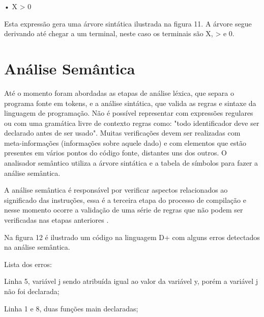 \documentclass[12pt,oneside,a4paper,chapter=TITLE,section=TITLE,sumario=tradicional]{abntex2}
\begin{document}
•	X > 0

Esta expressão gera uma árvore sintática ilustrada na figura 11. A árvore segue derivando até chegar a um terminal, neste caso os terminais são X, > e 0.

\begin{figure}[htb]
\end{figure}

\section{Análise Semântica}
\label{sec:analise-semantica}

Até o momento foram abordadas as etapas de análise léxica, que separa o programa fonte em tokens, e a análise sintática, que valida as regras e sintaxe da linguagem de programação. Não é possível representar com expressões regulares ou com uma gramática livre de contexto regras como: "todo identificador deve ser declarado antes de ser usado". Muitas verificações devem ser realizadas com meta-informações (informações sobre aquele dado) e com elementos que estão presentes em vários pontos do código fonte, distantes uns dos outros. O analisador semântico utiliza a árvore sintática e a tabela de símbolos para fazer a análise semântica. 

A análise semântica é responsável por verificar aspectos relacionados ao significado das instruções, essa é a terceira etapa do processo de compilação e nesse momento ocorre a validação de uma série de regras que não podem ser verificadas nas etapas anteriores \cite{maragon2015}.

Na figura 12 é ilustrado um código na linguagem D+ com alguns erros detectados na análise semântica.

\begin{figure}[H]
\end{figure}

Lista dos erros:

\begin{lista}
	\item Linha 5, variável j sendo atribuída igual ao valor da variável y, porém a variável j não foi declarada;
	\item Linha 1 e 8, duas funções main declaradas;
\end{lista}
\end{document}
